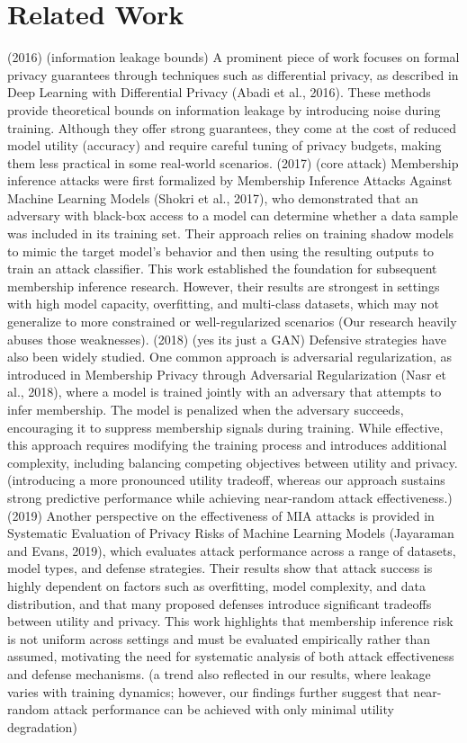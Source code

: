 \documentclass[conference]{IEEEtran}
\begin{document}
\section{Related Work}
(2016) (information leakage bounds)
A prominent piece of work focuses on formal privacy guarantees through techniques such as differential privacy, as described in Deep Learning with Differential Privacy (Abadi et al., 2016). These methods provide theoretical bounds on information leakage by introducing noise during training. Although they offer strong guarantees, they come at the cost of reduced model utility (accuracy) and require careful tuning of privacy budgets, making them less practical in some real-world scenarios.
(2017) (core attack)
Membership inference attacks were first formalized by Membership Inference Attacks Against Machine Learning Models (Shokri et al., 2017), who demonstrated that an adversary with black-box access to a model can determine whether a data sample was included in its training set. Their approach relies on training shadow models to mimic the target model’s behavior and then using the resulting outputs to train an attack classifier. This work established the foundation for subsequent membership inference research. However, their results are strongest in settings with high model capacity, overfitting, and multi-class datasets, which may not generalize to more constrained or well-regularized scenarios (Our research heavily abuses those weaknesses).
(2018) (yes its just a GAN)
Defensive strategies have also been widely studied. One common approach is adversarial regularization, as introduced in Membership Privacy through Adversarial Regularization (Nasr et al., 2018), where a model is trained jointly with an adversary that attempts to infer membership. The model is penalized when the adversary succeeds, encouraging it to suppress membership signals during training. While effective, this approach requires modifying the training process and introduces additional complexity, including balancing competing objectives between utility and privacy. (introducing a more pronounced utility tradeoff, whereas our approach sustains strong predictive performance while achieving near-random attack effectiveness.)
(2019)
Another perspective on the effectiveness of MIA attacks is provided in Systematic Evaluation of Privacy Risks of Machine Learning Models (Jayaraman and Evans, 2019), which evaluates attack performance across a range of datasets, model types, and defense strategies. Their results show that attack success is highly dependent on factors such as overfitting, model complexity, and data distribution, and that many proposed defenses introduce significant tradeoffs between utility and privacy. This work highlights that membership inference risk is not uniform across settings and must be evaluated empirically rather than assumed, motivating the need for systematic analysis of both attack effectiveness and defense mechanisms. (a trend also reflected in our results, where leakage varies with training dynamics; however, our findings further suggest that near-random attack performance can be achieved with only minimal utility degradation)
\end{document}
